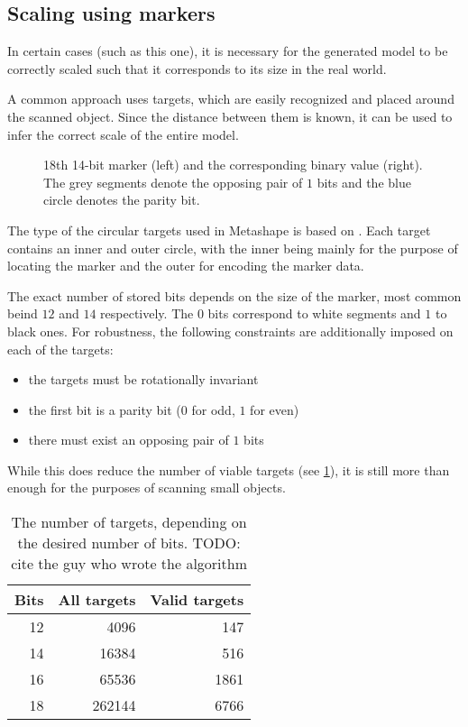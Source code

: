 \subsection{Scaling using markers}
In certain cases (such as this one), it is necessary for the generated model to be correctly scaled such that it corresponds to its size in the real world.

A common approach uses targets, which are easily recognized and placed around the scanned object.
Since the distance between them is known, it can be used to infer the correct scale of the entire model.

\begin{figure}
\centering
	
	\caption{18th 14-bit marker (left) and the corresponding binary value (right). The grey segments denote the opposing pair of $1$ bits and the blue circle denotes the parity bit. }
\end{figure}

The type of the circular targets used in Metashape is based on \citet{schneider19913,borisPatent}.
Each target contains an inner and outer circle, with the inner being mainly for the purpose of locating the marker and the outer for encoding the marker data.

The exact number of stored bits depends on the size of the marker, most common beind $12$ and $14$ respectively.
The $0$ bits correspond to white segments and $1$ to black ones.
For robustness, the following constraints are additionally imposed on each of the targets:

\begin{itemize}
	\item the targets must be rotationally invariant
	\item the first bit is a parity bit ($0$ for odd, $1$ for even)
	\item there must exist an opposing pair of $1$ bits
\end{itemize}

While this does reduce the number of viable targets (see \cref{tab:markers}), it is still more than enough for the purposes of scanning small objects.

\begin{table}
\centering\footnotesize\sf
\begin{tabular}{rrr}
\toprule
Bits & All targets & Valid targets \\
\midrule
12 & 4096   & 147 \\
14 & 16384  & 516 \\
16 & 65536  & 1861 \\
18 & 262144 & 6766 \\
\bottomrule
\end{tabular}
\caption{The number of targets, depending on the desired number of bits. TODO: cite the guy who wrote the algorithm}
\label{tab:markers}
\end{table}
